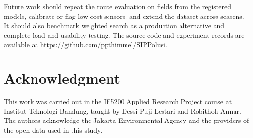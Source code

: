 \documentclass[conference]{IEEEtran}
\begin{document}
Future work should repeat the route evaluation on fields from the registered models, calibrate or flag low-cost sensors, and extend the dataset across seasons. It should also benchmark weighted search as a production alternative and complete load and usability testing. The source code and experiment records are available at \url{https://github.com/ppthimmel/SIPPolusi}.

\section*{Acknowledgment}

This work was carried out in the IF5200 Applied Research Project course at Institut Teknologi Bandung, taught by Dessi Puji Lestari and Robithoh Annur. The authors acknowledge the Jakarta Environmental Agency and the providers of the open data used in this study.




\end{document}
